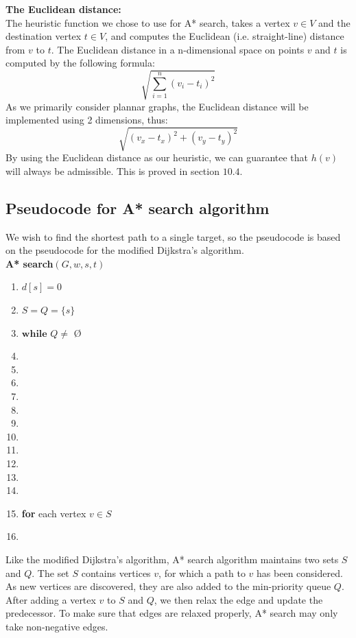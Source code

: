 \documentclass[11pt]{article}
\begin{document}
\noindent \textbf{The Euclidean distance:}\\
\noindent The heuristic function we chose to use for A* search, takes a vertex $v \in V$ and the destination vertex $t \in V$, and computes the Euclidean (i.e. straight-line) distance from $v$ to $t$. The Euclidean distance in a n-dimensional space on points $v$ and $t$ is computed by the following formula:\\
$$\sqrt{\displaystyle\sum_{i=1}^{n} (v_i - t_i)^2}$$
As we primarily consider plannar graphs, the Euclidean distance will be implemented using 2 dimensions, thus:\\
$$\sqrt{(v_x - t_x)^2 + (v_y - t_y)^2}$$
By using the Euclidean distance as our heuristic, we can guarantee that $h(v)$ will always be admissible. This is proved in section $10.4$.


\subsection{Pseudocode for A* search algorithm}
We wish to find the shortest path to a single target, so the pseudocode is based on the pseudocode for the modified Dijkstra's algorithm.\\

\textbf{A* search$(G, w, s, t)$}
\begin{enumerate}
\setlength\itemsep{0em}
\item $d[s] = 0$
\item $S = Q = \{s\}$
\item $\textbf{while } Q \neq  $ \O
\item {}
\item {}
\item \tab{}
\item \tab{}\tab{}
\item \tab{}
\item {}
\item \tab{}
\item \tab{}\tab{}
\item \tab{}\tab{}
\item \tab{}\tab{}
\item \tab{}\tab{}
\item \textbf{for} each vertex $v \in S$
\item {}
\end{enumerate}
Like the modified Dijkstra's algorithm, A* search algorithm maintains two sets $S$ and $Q$. The set $S$ contains vertices $v$, for which a path to $v$ has been considered. As new vertices are discovered, they are also added to the min-priority queue $Q$. After adding a vertex $v$ to $S$ and $Q$, we then relax the edge and update the predecessor. To make sure that edges are relaxed properly, A* search may only take non-negative edges.\\
\end{document}
